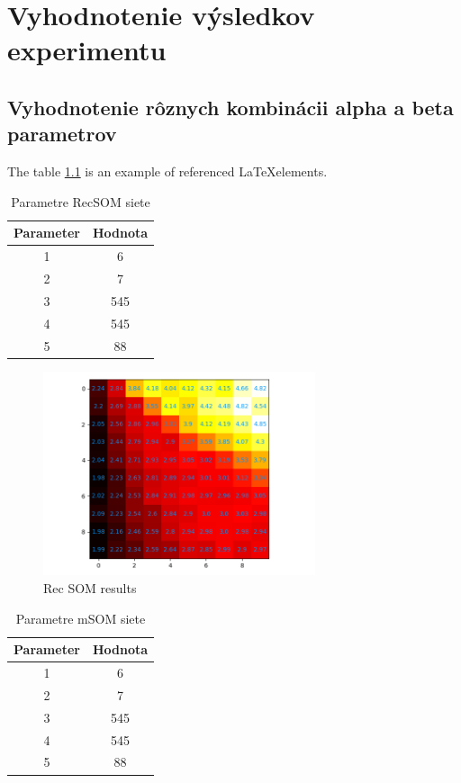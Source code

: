 \chapter{Vyhodnotenie výsledkov experimentu}


\section{Vyhodnotenie rôznych kombinácii alpha a beta parametrov}

The table \ref{table:1} is an example of referenced \LaTeX elements.
 
\begin{table}[h!]
\centering
\begin{tabular}{|c|c|} 
 \hline
 Parameter & Hodnota \\ 
 \hline\hline
 1 & 6  \\ 
 \hline
 2 & 7   \\
 \hline
 3 & 545  \\
 \hline
 4 & 545  \\
 \hline
 5 & 88 \\  
 \hline
\end{tabular}
\caption{Parametre RecSOM siete}
\label{table:1}
\end{table}


\begin{figure}[H]
    \centering
    \includegraphics[width=8cm]{assets/recsom_abcd}
    \caption{Rec SOM results}
\end{figure}


\begin{table}[h!]
    \centering
    \begin{tabular}{|c|c|} 
     \hline
     Parameter & Hodnota \\ 
     \hline\hline
     1 & 6  \\ 
     \hline
     2 & 7   \\
     \hline
     3 & 545  \\
     \hline
     4 & 545  \\
     \hline
     5 & 88 \\  
     \hline
    \end{tabular}
    \caption{Parametre mSOM siete}
    \label{table:2}
\end{table}

